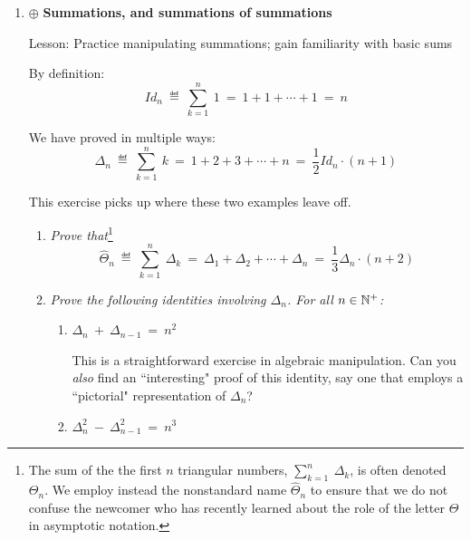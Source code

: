 \begin{enumerate}
{\em Propose another analysis by gathering the terms 3 by 3.}

\medskip\item
$\oplus$ {\bf Summations, and summations of summations}

{\sc Lesson:} Practice manipulating summations; gain familiarity with basic sums

\smallskip

By definition:
\[ Id_n \ \eqdef \ \sum_{k=1}^n \ 1 \ = \ 1 + 1 + \cdots +1 \  = \ n \]

We have proved in multiple ways:
\[ \Delta_n \ \eqdef \  \sum_{k=1}^n \ k \ = \ 1+2+3+ \cdots +n \ = \ \frac{1}{2} Id_n \cdot (n+1) \]

\smallskip

This exercise picks up where these two examples leave off.

  \begin{enumerate}
  \item 
{\em Prove that}\footnote{\label{foot:Theta}The sum of the the first $n$ triangular numbers, $\sum_{k=1}^n \ \Delta_k$, is often denoted $\Theta_n$.  We employ instead the nonstandard name $\widehat{\Theta}_n$ to ensure that we do not confuse the newcomer who has recently learned about the role of the letter $\Theta$ in asymptotic notation.} 
\[ \widehat{\Theta}_n \ \eqdef \  \sum_{k=1}^n \ \Delta_k \ = \   
\Delta_1 + \Delta_2 + \cdots + \Delta_n \ = \ \frac{1}{3} \Delta_n \cdot (n+2) \]


  \medskip\item
{\em Prove the following identities involving $\Delta_n$.  For all $n \in \mathbb{N}^+$:}
    \begin{enumerate}
    \item
$\Delta_n \ + \ \Delta_{n-1} \ = \ n^2$

\smallskip

This is a straightforward exercise in algebraic manipulation.  Can you {\em also} find an ``interesting" proof of this identity, say one that employs a ``pictorial" representation of $\Delta_n$?

    \medskip\item
$\Delta_n^2 \ - \ \Delta_{n-1}^2 \ = \ n^3$


\end{enumerate}
\end{enumerate}
\end{enumerate}
